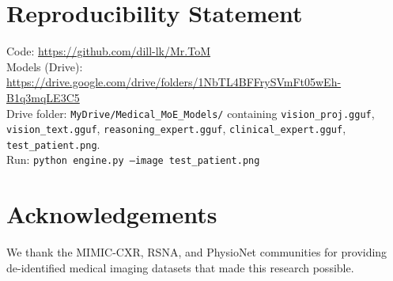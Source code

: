 \documentclass[10pt,twocolumn]{article}
\begin{document}
\section*{Reproducibility Statement}
Code: \url{https://github.com/dill-lk/Mr.ToM}\\
Models (Drive): \url{https://drive.google.com/drive/folders/1NbTL4BFFrySVmFt05wEh-B1q3mqLE3C5}\\
Drive folder: \texttt{MyDrive/Medical\_MoE\_Models/} containing
\texttt{vision\_proj.gguf}, \texttt{vision\_text.gguf},
\texttt{reasoning\_expert.gguf}, \texttt{clinical\_expert.gguf},
\texttt{test\_patient.png}.\\
Run: \texttt{python engine.py --image test\_patient.png}

\section*{Acknowledgements}
We thank the MIMIC-CXR, RSNA, and PhysioNet communities for providing
de-identified medical imaging datasets that made this research possible.
\end{document}
